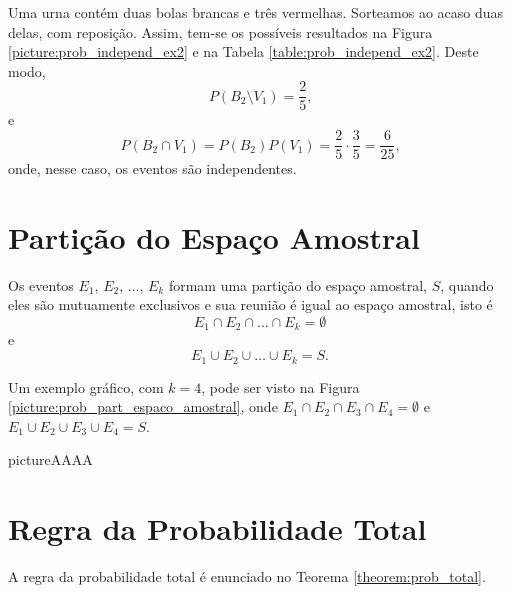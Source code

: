 \documentclass[11pt,fleqn]{book}
\numberwithin{mpicture}{chapter}
\numberwithin{mtable}{chapter}
\numberwithin{mframe}{chapter}
\begin{document}
\begin{example}
	Uma urna contém duas bolas brancas e três vermelhas. Sorteamos ao acaso duas delas, com reposição. Assim, tem-se os possíveis resultados na Figura \ref{picture:prob_independ_ex2} e na Tabela \ref{table:prob_independ_ex2}. Deste modo,
	\[
		P(B_2\setminus V_1)=\frac{2}{5}\text{,}
	\]
	e
	\[
		P(B_2\cap V_1)=P(B_2)P(V_1)=\frac{2}{5}\cdot \frac{3}{5}=\frac{6}{25}\text{,}
	\]
	onde, nesse caso, os eventos são independentes.
\end{example}

\section{Partição do Espaço Amostral}

Os eventos $E_1$, $E_2$, $\dots$, $E_k$ formam uma partição do espaço amostral, $S$, quando eles são mutuamente exclusivos e sua reunião é igual ao espaço amostral, isto é
\[
	E_1\cap E_2\cap \dots \cap E_k=\emptyset
\]
e
\[
	E_1\cup E_2\cup \dots \cup E_k=S\text{.}
\]

Um exemplo gráfico, com $k=4$, pode ser visto na Figura \ref{picture:prob_part_espaco_amostral}, onde $E_1\cap E_2 \cap E_3 \cap E_4=\emptyset$ e $E_1\cup E_2\cup E_3 \cup E_4=S$.

\begin{sidepicture}{0}{picture}{AAAA}
	\label{picture:prob_part_espaco_amostral}
\end{sidepicture}

\section{Regra da Probabilidade Total}

A regra da probabilidade total é enunciado no Teorema \ref{theorem:prob_total}.
\end{document}
